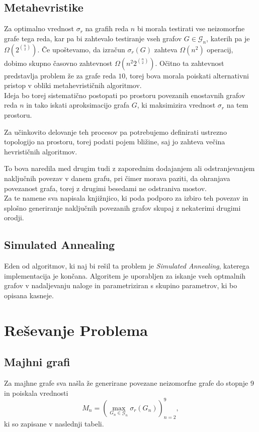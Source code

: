 \documentclass[ letterpaper, titlepage, fleqn]{article}
\begin{document}
\subsection{Metahevristike}
Za optimalno vrednost $\sigma_r$ na grafih reda $n$ bi morala testirati vse neizomorfne
grafe tega reda, kar pa bi zahtevalo testiranje vseh grafov $G \in \mathscr{G}_n$, 
katerih pa je $\Omega\left(2^{\binom{n}{2}}\right)$. Če upoštevamo, da izračun $\sigma_r(G)$ 
zahteva $\Omega(n^2)$ operacij, dobimo skupno časovno zahtevnost $\Omega\left(n^2 2^{\binom{n}{2}}\right)$.
Očitno ta zahtevnost predstavlja problem že za grafe reda $10$, 
torej bova morala poiskati alternativni pristop v obliki metahevrističnih algoritmov. \\

Ideja bo torej sistematično postopati po prostoru povezanih enostavnih grafov reda $n$ in 
tako iskati aproksimacijo grafa $G$, ki maksimizira vrednost $\sigma_r$ na tem prostoru.

Za učinkovito delovanje teh procesov pa potrebujemo definirati ustrezno topologijo 
na prostoru, torej podati pojem bližine, saj jo zahteva večina hevrističnih algoritmov.

To bova naredila med drugim tudi z zaporednim dodajanjem ali odstranjevanjem naključnih povezav v 
danem grafu, pri čimer morava paziti, da ohranjava povezanost grafa, 
torej z drugimi besedami ne odstraniva mostov.\\
Za te namene sva napisala knjižnjico, ki poda podporo za izbiro teh povezav
in splošno generiranje naključnih povezanih grafov skupaj z nekaterimi drugimi orodji.

\subsection{Simulated Annealing}
Eden od algoritmov, ki naj bi rešil ta problem je {\em Simulated Annealing}, 
katerega implementacija je končana.
Algoritem je uporabljen za iskanje vseh optmalnih grafov v nadaljevanju naloge in parametriziran
s skupino parametrov, ki bo opisana kasneje.

\section{Reševanje Problema}

\subsection{Majhni grafi}
Za majhne grafe sva našla že generirane povezane neizomorfne grafe do stopnje 9 in poiskala vrednosti 
$$M_n = (\max_{G_n \in \mathscr{G}_n} \sigma_r(G_n))_{n=2}^9,$$
ki so zapisane v naslednji tabeli.
\end{document}
